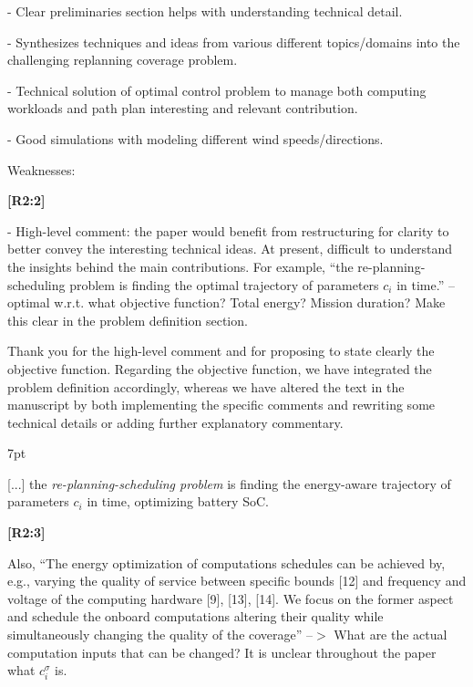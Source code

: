\documentclass[10pt]{letter}
\newenvironment{formal}{%
  \def\FrameCommand{%
    \hspace{1pt}%
    {\color{red}\vrule width 2pt}%
    {\color{formalshade}\vrule width 4pt}%
    \colorbox{formalshade}%
  }%
  \MakeFramed{\advance\hsize-\width\FrameRestore}%
  \noindent\hspace{-4.55pt}%
  \begin{adjustwidth}{}{7pt}%
  \vspace{2pt}\vspace{2pt}%
}
{%
  \vspace{2pt}\end{adjustwidth}\endMakeFramed%
}
\begin{document}
- Clear preliminaries section helps with understanding technical detail.

- Synthesizes techniques and ideas from various different topics/domains into the challenging replanning coverage problem.

- Technical solution of optimal control problem to manage both computing workloads and path plan interesting and relevant contribution.
  
- Good simulations with modeling different wind speeds/directions.

\vspace{2em}

Weaknesses:

  
{\hspace*{-4.5em}\textbf{[R2:2]}\vspace*{-1.9em}}
  
- High-level comment: the paper would benefit from restructuring for clarity to better convey the interesting technical ideas. At present, difficult to understand the insights behind the main contributions. For example, ``the re-planning-scheduling problem is finding the optimal trajectory of parameters $c_i$ in time.'' -- optimal w.r.t. what objective function? Total energy? Mission duration? Make this clear in the problem definition section. 
  
{\color{blue} 

{\hspace*{-4.5em}{[R2:2]}\vspace*{-1.9em}}

Thank you for the high-level comment and for proposing to state clearly the objective function. Regarding the objective function, we have integrated the problem definition accordingly, whereas we have altered the text in the manuscript by both implementing the specific comments and rewriting some technical details or adding further explanatory commentary. 

\begin{formal}
  {\color{black} [...] the \emph{re-planning-scheduling problem} is finding the {\color{blue}energy-aware} trajectory of parameters $c_i$ in time{\color{blue}, optimizing battery SoC}.}
  \vspace*{1ex}
\end{formal}
}
  
  {\hspace*{-4.5em}\textbf{[R2:3]}\vspace*{-1.9em}}

  Also, ``The energy optimization of computations schedules can be achieved by, e.g., varying the quality of service between specific bounds [12] and frequency and voltage of the computing hardware [9], [13], [14]. We focus on the former aspect and schedule the onboard computations altering their quality while simultaneously changing the quality of the coverage'' --$>$ What are the actual computation inputs that can be changed? It is unclear throughout the paper what $c_i^\sigma$ is. 
  
\end{document}
